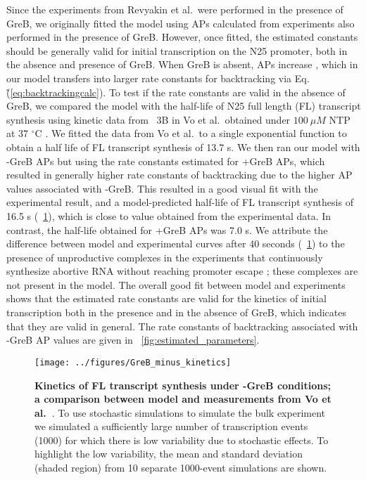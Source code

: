 Since the experiments from Revyakin et al.\ were performed in the presence of
GreB, we originally fitted the model using APs calculated from experiments
also performed in the presence of GreB. However, once fitted, the estimated
constants should be generally valid for initial transcription on the N25
promoter, both in the absence and presence of GreB. When GreB is absent, APs
increase \cite{hsu_initial_2006}, which in our model transfers into larger
rate constants for backtracking via Eq.\~(\ref{eq:backtrackingcalc}). To test
if the rate constants are valid in the absence of GreB, we compared the model
with the half-life of N25 full length (FL) transcript synthesis using kinetic
data from \FIG~3B in Vo et al.\, obtained under $100\ \mu M$ NTP at 37
$^{\circ}$C \cite{vo_vitro_2003-1}. We fitted the data from Vo et al.\ to a
single exponential function to obtain a half life of FL transcript synthesis
of 13.7 s. We then ran our model with -GreB APs but using the rate constants
estimated for +GreB APs, which resulted in generally higher rate constants of
backtracking due to the higher AP values associated with -GreB. This resulted
in a good visual fit with the experimental result, and a model-predicted
half-life of FL transcript synthesis of 16.5 s (\FIG~\ref{fig:vo_comparison}),
which is close to value obtained from the experimental data. In contrast, the
half-life obtained for +GreB APs was 7.0 s. We attribute the difference
between model and experimental curves after 40 seconds
(\FIG~\ref{fig:vo_comparison}) to the presence of unproductive complexes in
the experiments that continuously synthesize abortive RNA without reaching
promoter escape \cite{vo_vitro_2003-1}; these complexes are not present in the
model. The overall good fit between model and experiments shows that the
estimated rate constants are valid for the kinetics of initial transcription
both in the presence and in the absence of GreB, which indicates that they are
valid in general. The rate constants of backtracking associated with -GreB AP
values are given in \FIG~\ref{fig:estimated_parameters}.

\begin{figure}[h]
    \begin{center}
        \texttt{[image: ../figures/GreB\_minus\_kinetics]}
    \end{center}
    \caption{ {\bf Kinetics of FL transcript synthesis under -GreB conditions;
        a comparison between model and measurements from Vo
      et al.~\cite{vo_vitro_2003-1}}. To use stochastic simulations to
      simulate the bulk experiment we simulated a sufficiently large number of
      transcription events (1000) for which there is low variability due to
      stochastic effects. To highlight the low variability, the mean and
      standard deviation (shaded region) from 10 separate 1000-event
      simulations are shown.}
\label{fig:vo_comparison}
\end{figure}

